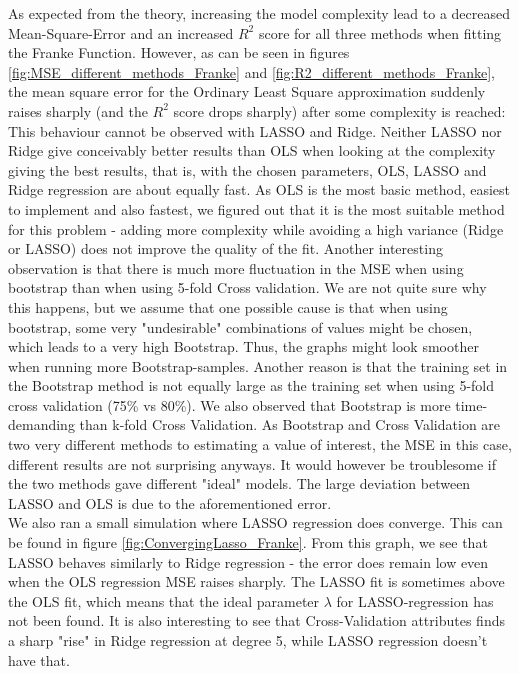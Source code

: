\documentclass[11pt,a4paper,titlepage]{article}
\begin{document}
As expected from the theory, increasing the model complexity lead to a decreased Mean-Square-Error and an increased $R^2$ score for all three methods when fitting the Franke Function. However, as can be seen in figures \ref{fig:MSE_different_methods_Franke} and \ref{fig:R2_different_methods_Franke}, the mean square error for the Ordinary Least Square approximation suddenly raises sharply (and the $R^2$ score drops sharply) after some complexity is reached: This behaviour cannot be observed with LASSO and Ridge. Neither LASSO nor Ridge give conceivably better results than OLS when looking at the complexity giving the best results, that is, with the chosen parameters, OLS, LASSO and Ridge regression are about equally fast. As OLS is the most basic method, easiest to implement and also fastest, we figured out that it is the most suitable method for this problem - adding more complexity while avoiding a high variance (Ridge or LASSO) does not improve the quality of the fit.  Another interesting observation is that there is much more fluctuation in the MSE when using bootstrap than when using 5-fold Cross validation. We are not quite sure why this happens, but we assume that one possible cause is that when using bootstrap, some very "undesirable" combinations of values might be chosen, which leads to a very high Bootstrap. Thus, the graphs might look smoother when running more Bootstrap-samples. Another reason is that the training set in the Bootstrap method is not equally large as the training set when using 5-fold cross validation (75\% vs 80\%). We also observed that Bootstrap is more time-demanding than k-fold Cross Validation. As Bootstrap and Cross Validation are two very different methods to estimating a value of interest, the MSE in this case, different results are not surprising anyways. It would however be troublesome if the two methods gave different "ideal" models. The large deviation between LASSO and OLS is due to the aforementioned error. \\
We also ran a small simulation where LASSO regression does converge. This can be found in figure \ref{fig:ConvergingLasso_Franke}. From this graph, we see that LASSO behaves similarly to Ridge regression - the error does remain low even when the OLS regression MSE raises sharply. The LASSO fit is sometimes above the OLS fit, which means that the ideal parameter $\lambda$ for LASSO-regression has not been found. It is also interesting to see that Cross-Validation attributes finds a sharp "rise" in Ridge regression at degree 5, while LASSO regression doesn't have that.
\end{document}
